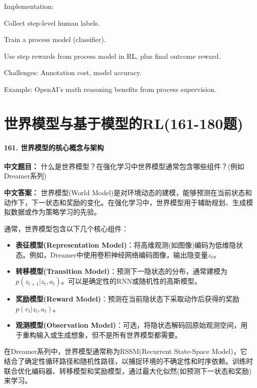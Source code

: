 \documentclass[10pt,a4paper]{ctexart}
\begin{document}
Implementation:

Collect step-level human labels.

Train a process model (classifier).

Use step rewards from process model in RL, plus final outcome reward.

Challenges: Annotation cost, model accuracy.

Example: OpenAI's math reasoning benefits from process supervision.

\part{世界模型与基于模型的RL(161-180题)}

\subsection*{161. 世界模型的核心概念与架构}
\textbf{中文题目：} 什么是世界模型？在强化学习中世界模型通常包含哪些组件？(例如Dreamer系列)

\textbf{中文答案：}  
世界模型(World Model)是对环境动态的建模，能够预测在当前状态和动作下，下一状态和奖励的变化。在强化学习中，世界模型用于辅助规划、生成模拟数据或作为策略学习的先验。

通常，世界模型包含以下几个核心组件：
\begin{itemize}
    \item \textbf{表征模型(Representation Model)}：将高维观测(如图像)编码为低维隐状态。例如，Dreamer中使用卷积神经网络编码图像，输出隐变量$z_t$。
    \item \textbf{转移模型(Transition Model)}：预测下一隐状态的分布，通常建模为$p(z_{t+1} | z_t, a_t)$。可以是确定性的RNN或随机性的高斯模型。
    \item \textbf{奖励模型(Reward Model)}：预测在当前隐状态下采取动作后获得的奖励$p(r_t | z_t, a_t)$。
    \item \textbf{观测模型(Observation Model)}：可选，将隐状态解码回原始观测空间，用于重构输入或生成想象，但不是所有世界模型都需要。
\end{itemize}

在Dreamer系列中，世界模型通常称为RSSM(Recurrent State-Space Model)，它结合了确定性循环路径和随机性路径，以捕捉环境的不确定性和时序依赖。训练时联合优化编码器、转移模型和奖励模型，通过最大化似然(如预测下一状态和奖励)来学习。
\end{document}
